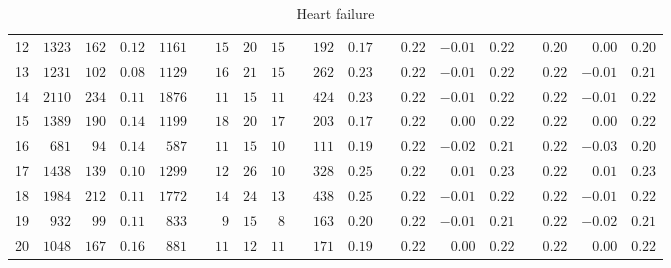 \documentclass[]{article}\usepackage[]{graphicx}\usepackage[]{color}
\begin{document}
\begin{landscape}
\begin{table}[!tbp]
\begin{center}
\begin{tabular}{lrrrrcrrrcrrcrrrcrrr}
12&$1323$&$162$&$0.12$&$1161$&&$15$&$20$&$15$&&$192$&$0.17$&&$0.22$&$-0.01$&$0.22$&&$0.20$&$ 0.00$&$0.20$\tabularnewline
13&$1231$&$102$&$0.08$&$1129$&&$16$&$21$&$15$&&$262$&$0.23$&&$0.22$&$-0.01$&$0.22$&&$0.22$&$-0.01$&$0.21$\tabularnewline
14&$2110$&$234$&$0.11$&$1876$&&$11$&$15$&$11$&&$424$&$0.23$&&$0.22$&$-0.01$&$0.22$&&$0.22$&$-0.01$&$0.22$\tabularnewline
15&$1389$&$190$&$0.14$&$1199$&&$18$&$20$&$17$&&$203$&$0.17$&&$0.22$&$ 0.00$&$0.22$&&$0.22$&$ 0.00$&$0.22$\tabularnewline
16&$ 681$&$ 94$&$0.14$&$ 587$&&$11$&$15$&$10$&&$111$&$0.19$&&$0.22$&$-0.02$&$0.21$&&$0.22$&$-0.03$&$0.20$\tabularnewline
17&$1438$&$139$&$0.10$&$1299$&&$12$&$26$&$10$&&$328$&$0.25$&&$0.22$&$ 0.01$&$0.23$&&$0.22$&$ 0.01$&$0.23$\tabularnewline
18&$1984$&$212$&$0.11$&$1772$&&$14$&$24$&$13$&&$438$&$0.25$&&$0.22$&$-0.01$&$0.22$&&$0.22$&$-0.01$&$0.22$\tabularnewline
19&$ 932$&$ 99$&$0.11$&$ 833$&&$ 9$&$15$&$ 8$&&$163$&$0.20$&&$0.22$&$-0.01$&$0.21$&&$0.22$&$-0.02$&$0.21$\tabularnewline
20&$1048$&$167$&$0.16$&$ 881$&&$11$&$12$&$11$&&$171$&$0.19$&&$0.22$&$ 0.00$&$0.22$&&$0.22$&$ 0.00$&$0.22$\tabularnewline
\hline
\end{tabular}

\caption{Heart failure\label{round}}\end{center}

\end{table}




\end{landscape}
\end{document}

